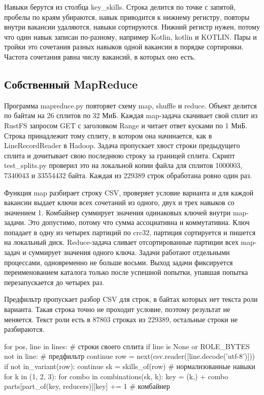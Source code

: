 Навыки берутся из столбца key\_skills. Строка делится по точке с запятой,
пробелы по краям убираются, навык приводится к нижнему регистру, повторы
внутри вакансии удаляются, навыки сортируются. Нижний регистр нужен, потому
что один навык записан по-разному, например Kotlin, kotlin и KOTLIN. Пары и
тройки это сочетания разных навыков одной вакансии в порядке сортировки.
Частота сочетания равна числу вакансий, в которых оно есть.

\subsection{Собственный MapReduce}

Программа mapreduce.py повторяет схему map, shuffle и reduce. Объект
делится по байтам на 26 сплитов по 32 МиБ. Каждая map-задача скачивает свой
сплит из RustFS запросом GET с заголовком Range и читает ответ кусками по
1 МиБ. Строка принадлежит тому сплиту, в котором она начинается, как в
LineRecordReader в Hadoop. Задача пропускает хвост строки предыдущего сплита
и дочитывает свою последнюю строку за границей сплита. Скрипт test\_splits.py
проверил это на локальной копии файла для сплитов 1000003, 7340043 и
33554432 байта. Каждая из 229389 строк обработана ровно один раз.

Функция map разбирает строку CSV, проверяет условие варианта и для каждой
вакансии выдает ключи всех сочетаний из одного, двух и трех навыков со
значением 1. Комбайнер суммирует значения одинаковых ключей внутри map-задачи.
Это допустимо, потому что сумма ассоциативна и коммутативна. Ключ попадает в
одну из четырех партиций по crc32, партиция сортируется и пишется на
локальный диск. Reduce-задача сливает отсортированные партиции всех
map-задач и суммирует значения одного ключа. Задачи работают отдельными
процессами, одновременно не больше восьми. Выход задачи фиксируется
переименованием каталога только после успешной попытки, упавшая попытка
перезапускается до четырех раз.

Предфильтр пропускает разбор CSV для строк, в байтах которых нет текста роли
варианта. Такая строка точно не проходит условие, поэтому результат не
меняется. Текст роли есть в 87803 строках из 229389, остальные строки
не разбираются.

\begin{code}
for pos, line in lines:                          # строки своего сплита
    if line is None or ROLE_BYTES not in line:   # предфильтр
        continue
    row = next(csv.reader([line.decode('utf-8')]))
    if not in_variant(row):
        continue
    sk = skills_of(row)                          # нормализованные навыки
    for k in (1, 2, 3):
        for combo in combinations(sk, k):
            key = (k,) + combo
            parts[part_of(key, reducers)][key] += 1   # комбайнер
\end{code}

